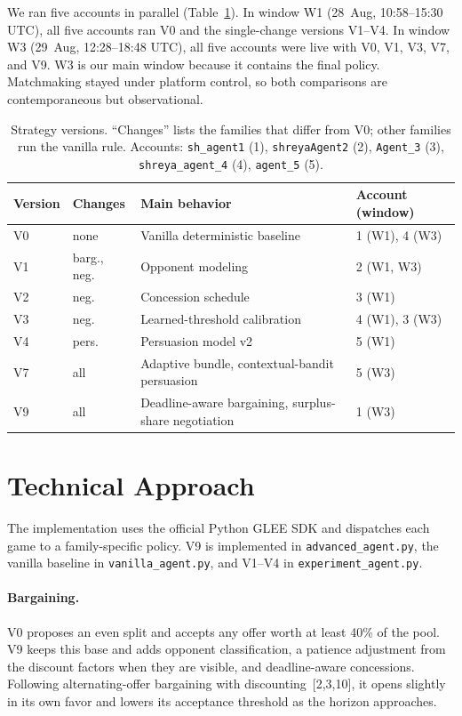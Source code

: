 \documentclass{article}
\begin{document}
We ran five accounts in parallel (Table~\ref{tab:versions}). In window W1 (28~Aug, 10:58--15:30 UTC), all five accounts ran V0 and the single-change versions V1--V4. In window W3 (29~Aug, 12:28--18:48 UTC), all five accounts were live with V0, V1, V3, V7, and V9. W3 is our main window because it contains the final policy. Matchmaking stayed under platform control, so both comparisons are contemporaneous but observational.

\begin{table}[H]
\caption{Strategy versions. ``Changes'' lists the families that differ from V0; other families run the vanilla rule. Accounts: \texttt{sh\_agent1} (1), \texttt{shreyaAgent2} (2), \texttt{Agent\_3} (3), \texttt{shreya\_agent\_4} (4), \texttt{agent\_5} (5).}
\label{tab:versions}
\centering
\small
\begin{tabular}{llll}
\toprule
Version & Changes & Main behavior & Account (window) \\
\midrule
V0 & none & Vanilla deterministic baseline & 1 (W1), 4 (W3) \\
V1 & barg., neg. & Opponent modeling & 2 (W1, W3) \\
V2 & neg. & Concession schedule & 3 (W1) \\
V3 & neg. & Learned-threshold calibration & 4 (W1), 3 (W3) \\
V4 & pers. & Persuasion model v2 & 5 (W1) \\
V7 & all & Adaptive bundle, contextual-bandit persuasion & 5 (W3) \\
V9 & all & Deadline-aware bargaining, surplus-share negotiation & 1 (W3) \\
\bottomrule
\end{tabular}
\end{table}

\section{Technical Approach}

The implementation uses the official Python GLEE SDK and dispatches each game to a family-specific policy. V9 is implemented in \texttt{advanced\_agent.py}, the vanilla baseline in \texttt{vanilla\_agent.py}, and V1--V4 in \texttt{experiment\_agent.py}.

\paragraph{Bargaining.}
V0 proposes an even split and accepts any offer worth at least 40\% of the pool. V9 keeps this base and adds opponent classification, a patience adjustment from the discount factors when they are visible, and deadline-aware concessions. Following alternating-offer bargaining with discounting~[2,3,10], it opens slightly in its own favor and lowers its acceptance threshold as the horizon approaches.
\end{document}
